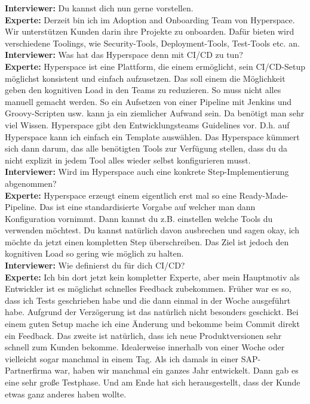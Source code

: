 \begin{linenumbers}
    \textbf{Interviewer:} Du kannst dich nun gerne vorstellen.\\
    \textbf{Experte:} Derzeit bin ich im Adoption and Onboarding Team von Hyperspace. Wir unterstützen Kunden darin ihre Projekte zu onboarden. Dafür bieten wird verschiedene Toolings, wie Security-Tools, Deployment-Tools, Test-Tools etc. an.\\
    \textbf{Interviewer:} Was hat das Hyperspace denn mit CI/CD zu tun?\\
    \textbf{Experte:} Hyperspace ist eine Plattform, die einem ermöglicht, sein CI/CD-Setup möglichst konsistent und einfach aufzusetzen. Das soll einem die Möglichkeit geben den kognitiven Load in den Teams zu reduzieren. So muss nicht alles manuell gemacht werden. So ein Aufsetzen von einer Pipeline mit Jenkins und Groovy-Scripten usw. kann ja ein ziemlicher Aufwand sein. Da benötigt man sehr viel Wissen. Hyperspace gibt den Entwicklungsteams Guidelines vor. D.h. auf Hyperspace kann ich einfach ein Template auswählen. Das Hyperspace kümmert sich dann darum, das alle benötigten Tools zur Verfügung stellen, dass du da nicht explizit in jedem Tool alles wieder selbst konfigurieren musst.\\
    \textbf{Interviewer:} Wird im Hyperspace auch eine konkrete Step-Implementierung abgenommen?\\
    \textbf{Experte:}  Hyperspace erzeugt einem eigentlich erst mal so eine Ready-Made-Pipeline. Das ist eine standardisierte Vorgabe auf welcher man dann Konfiguration vornimmt. Dann kannst du z.B. einstellen welche Tools du verwenden möchtest. Du kannst natürlich davon ausbrechen und sagen okay, ich möchte da jetzt einen kompletten Step überschreiben. Das Ziel ist jedoch den kognitiven Load so gering wie möglich zu halten.\\
    \textbf{Interviewer:} Wie definierst du für dich CI/CD?\\
    \textbf{Experte:} Ich bin dort jetzt kein kompletter Experte, aber mein Hauptmotiv als Entwickler ist es möglichst schnelles Feedback zubekommen. Früher war es so, dass ich Tests geschrieben habe und die dann einmal in der Woche ausgeführt habe. Aufgrund der Verzögerung ist das natürlich nicht besonders geschickt. Bei einem guten Setup mache ich eine Änderung und bekomme beim Commit direkt ein Feedback. Das zweite ist natürlich, dass ich neue Produktversionen sehr schnell zum Kunden bekomme. Idealerweise innerhalb von einer Woche oder vielleicht sogar manchmal in einem Tag. Als ich damals in einer SAP-Partnerfirma war, haben wir manchmal ein ganzes Jahr entwickelt. Dann gab es eine sehr große Testphase. Und am Ende hat sich herausgestellt, dass der Kunde etwas ganz anderes haben wollte.\\

\end{linenumbers}
